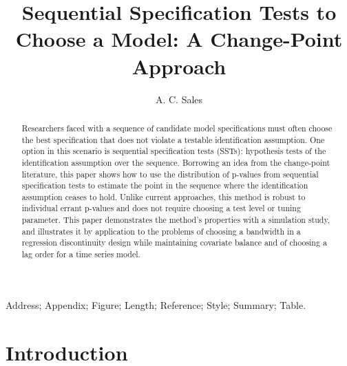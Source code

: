 \documentclass[lineno]{biometrika}\usepackage[]{graphicx}\usepackage[]{color}
\begin{document}
\accessdate{[Submitted]}%



\title{Sequential Specification Tests to Choose a Model: A Change-Point Approach}

\author{A. C. Sales}

\maketitle

\begin{abstract}
Researchers faced with a sequence of candidate model specifications must often choose the best specification that does not violate a testable identification assumption. One option in this scenario is sequential specification tests (SSTs): hypothesis tests of the identification assumption over the sequence. Borrowing an idea from the change-point literature, this paper shows how to use the distribution of p-values from sequential specification tests to estimate the point in the sequence where the identification assumption ceases to hold. Unlike current approaches, this method is robust to individual errant p-values and does not require choosing a test level or tuning parameter. This paper demonstrates the method's properties with a simulation study, and illustrates it by application to the problems of choosing a bandwidth in a regression discontinuity design while maintaining covariate balance and of choosing a lag order for a time series model.

\end{abstract}

\begin{keywords}
Address; Appendix; Figure; Length; Reference; Style; Summary; Table.
\end{keywords}


\section{Introduction}
\end{document}

